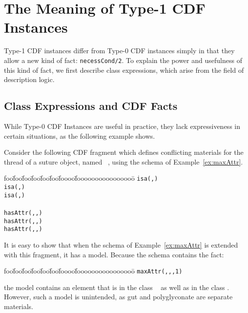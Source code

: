  
\chapter{The Meaning of Type-1 CDF Instances} \label{chap:type1}

Type-1 CDF instances differ from Type-0 CDF instances simply in that
they allow a new kind of fact: {\tt necessCond/2}.  To explain the
power and usefulness of this kind of fact, we first describe class
expressions, which arise from the field of description logic.

\section{Class Expressions and CDF Facts}

While Type-0 CDF Instances are useful in practice, they lack
expressiveness in certain situations, as the following example shows.

\begin{example} \rm \label{ex:ce1}
Consider the following CDF fragment which defines conflicting
materials for the thread of a suture object, named {\tt
{}}, using the schema of Example~\ref{ex:maxAttr}.
%
{\small
\begin{tabbing}
foo\=foo\=foo\=foo\=foo\=foo\=foooo\=foooooooooooooooo\=\kill
\> {\tt isa(,) }\\
\> {\tt isa(,) }\\
\> {\tt isa(,) }\\
\\
\> {\tt hasAttr(,,) }\\
\> {\tt hasAttr(,,) }\\
\> {\tt hasAttr(,,)}
\end{tabbing}
}
%
\noindent
It is easy to show that when the schema of Example~\ref{ex:maxAttr} is
extended with this fragment, it has a model.  Because the schema
contains the fact:
%
{\small
\begin{tabbing}
foo\=foo\=foo\=foo\=foo\=foo\=foooo\=foooooooooooooooo\=\kill
\> {\tt maxAttr(,,,1) } 
\end{tabbing}
} 
%
\noindent
the model contains an element that is in the class {\tt
{}} as well as in the class {\tt {}}.  However,
such a model is unintended, as gut and polyglyconate are separate
materials.
\end{example}

